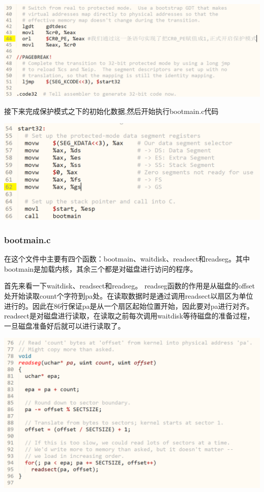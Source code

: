 \includegraphics[width=6in]{figures/boot/fig5.png}

接下来完成保护模式之下的初始化数据,然后开始执行bootmain.c代码

\includegraphics[width=6in]{figures/boot/fig6.png}

\subsubsection{bootmain.c}

在这个文件中主要有四个函数：bootmain、waitdisk、readsect和readseg。其中bootmain是加载内核，其余三个都是对磁盘进行访问的程序。

首先来看一下waitdisk、readsect和readseg。 readseg函数的作用是从磁盘的offset处开始读取count个字符到pa处。在读取数据时是通过调用readsect以扇区为单位进行的。因此在86行保证pa是从一个扇区起始位置开始，因此要对pa进行对齐。readsect是对磁盘进行读取，在读取之前每次调用waitdisk等待磁盘的准备过程，一旦磁盘准备好后就可以进行读取了。

\includegraphics[width=6in]{figures/boot/fig7.png}

